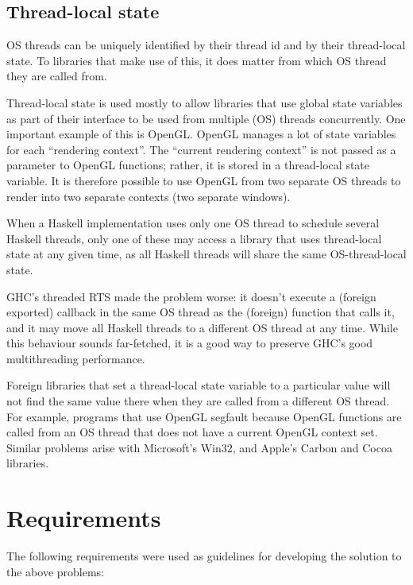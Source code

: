 \documentclass[a4paper,twoside]{article}
\begin{document}
\subsection{Thread-local state}
OS threads can be uniquely identified by their thread id and by their thread-local state.
To libraries that make use of this, it does matter from which OS thread they are called from.

Thread-local state is used mostly to allow libraries that use global state variables as part of
their interface to be used from multiple (OS) threads concurrently. One important example of
this is OpenGL. OpenGL manages a lot of state variables for each ``rendering context''.
The ``current rendering context'' is not passed as a parameter to OpenGL functions; rather,
it is stored in a thread-local state variable. It is therefore possible to use OpenGL from two
separate OS threads to render into two separate contexts (two separate windows).

When a Haskell implementation uses only one OS thread to schedule several Haskell
threads, only one of these may access a library that uses thread-local state at any given
time, as all Haskell threads will share the same OS-thread-local state.

GHC's threaded RTS made the problem worse: it doesn't execute a (foreign exported)
callback in the same OS thread as the (foreign) function that calls it, and it may move
all Haskell threads to a different OS thread at any time. While this behaviour sounds
far-fetched, it is a good way to preserve GHC's good multithreading performance.

Foreign libraries that set a thread-local state variable to a particular value will not find
the same value there when they are called from a different OS thread. For example,
programs that use OpenGL segfault because OpenGL functions are called from an OS
thread that does not have a current OpenGL context set. Similar problems arise with
Microsoft's Win32, and Apple's Carbon and Cocoa libraries.

\section{Requirements}

The following requirements were used as guidelines for developing the solution to the
above problems:
\end{document}

